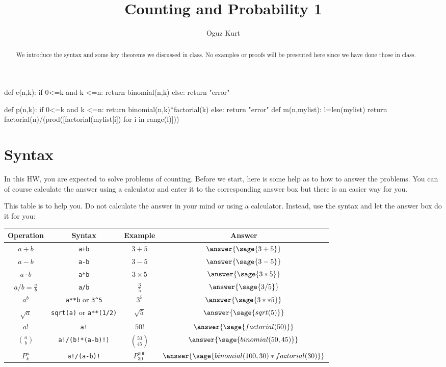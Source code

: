 \documentclass{ximera}
\title{Counting and Probability 1}
\author{Oguz Kurt}
\begin{document}
\begin{abstract}
We introduce the syntax and some key theorems we discussed in class. No examples or proofs will be presented here since we have done those in class.
\end{abstract}
\maketitle


\begin{sagesilent}
def c(n,k):
    if 0<=k and k <=n:
        return binomial(n,k)
    else:
        return "error"

def p(n,k):
    if 0<=k and k <=n:
        return binomial(n,k)*factorial(k)
    else:
        return "error"
def m(n,mylist):
    l=len(mylist)
    return factorial(n)/(prod([factorial(mylist[i]) for i in range(l)]))
\end{sagesilent}

\section*{Syntax}
In this HW, you are expected to solve problems of counting. Before we start, here is some help as to how to answer the problems. You can of course calculate the answer using a calculator and enter it to the corresponding answer box but there is an easier way for you. 

\hspace{0.5cm}

\begin{exercise} This table is to help you. Do not calculate the answer in your mind or using a calculator. Instead, use the syntax and let the answer box do it for you:

\begin{tabular}{c|c|c|c}
Operation & Syntax & Example & Answer 
\\
\hline
$a+b$ & {\color{red} \verb|a+b|} & $3+5$ & $\answer{\sage{3+5} }$
\\
\hline
$a- b$ & {\color{red} \verb|a-b|} & $3-5$ & $\answer{\sage{3-5} }$
\\
\hline
$a\cdot b$ & {\color{red} \verb|a*b| } & $3\times 5$ & $\answer{\sage{3*5} }$
\\
\hline
$a/b=\frac{a}{b}$ & {\color{red} \verb|a/b|} & $\frac{3}{5}$ & $\answer{\sage{3/5} }$
\\
\hline
$a^b$ & {\color{red} \verb|a**b| or \verb|3^5|} & $3^5$ & $\answer{\sage{3**5} }$
\\
\hline
$\sqrt{a}$ & {\color{red} \verb|sqrt(a)| or \verb|a**(1/2)|} & $\sqrt{5}$ & $\answer{\sage{sqrt(5)} }$
\\
\hline
$a!$ & {\color{red} \verb|a!|} & $50!$ & $\answer{\sage{factorial(50)} }$
\\
\hline
$\binom{a}{b}$ & {\color{red} \verb|a!/(b!*(a-b)!)|} & $\binom{50}{45}$ & $\answer{\sage{binomial(50,45)}}$ 
\\
\hline
$P_k^n$ & {\color{red} \verb|a!/(a-b)!|} & $P_{30}^{100}$ & $\answer{\sage{binomial(100,30)*factorial(30)} }$ 
\\
\end{tabular}
\end{exercise}
\end{document}
